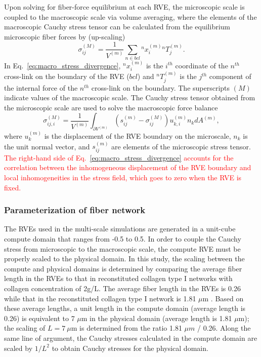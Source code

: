 \documentclass[10pt]{asme2ej}
\begin{document}
Upon solving for fiber-force equilibrium at each RVE, the microscopic scale is coupled to the macroscopic scale via volume averaging, where the elements of the macroscopic Cauchy stress tensor can be calculated from the equilibrium microscopic fiber forces by (up-scaling)\cite{Chandran:2007hy,Stylianopoulos:2007dp}
%
\begin{equation}
\sigma_{ij}^{(M)} = \frac{1}{V^{(m)}} \sum_{n \in bcl} {}^n x_i^{(m)} {}^n T_j^{(m)}.
\label{eq:macro_stress_discrete}
\end{equation}
%
In Eq.\ \eqref{eq:macro_stress_divergence}, ${}^nx_i^{(m)}$ is the $i^{th}$ coordinate of the $n^{th}$ cross-link on the boundary of the RVE ($bcl$) and ${}^nT_j^{(m)}$ is the $j^{th}$ component of the internal force of the $n^{th}$ cross-link on the boundary. The superscripts $(M)$ indicate values of the macroscopic scale. The Cauchy stress tensor obtained from the microscopic scale are used to solve the macroscopic force balance \cite{Chandran:2007hy,Stylianopoulos:2007dp}
%
\begin{equation}
\sigma_{ij,i}^{(M)} = \frac{1}{V^{(m)}} \int_{\partial V^{(m)}} \left( s_{ij}^{(m)} - \sigma_{ij}^{(M)} \right)u_{k,i}^{(m)} n_k dA^{(m)},
\label{eq:macro_stress_divergence}
\end{equation}
%
where $u_k^{(m)}$ is the displacement of the RVE boundary on the microscale, $n_k$ is the unit normal vector, and $s_{ij}^{(m)}$ are elements of the microscopic stress tensor. \textcolor{red}{The right-hand side of Eq.\ \eqref{eq:macro_stress_divergence} accounts for the correlation between the inhomogeneous displacement of the RVE boundary and local inhomogeneities in the stress field, which goes to zero when the RVE is fixed.}

\subsubsection{Parameterization of fiber network}
The RVEs used in the multi-scale simulations are generated in a unit-cube compute domain that ranges from -0.5 to 0.5. In order to couple the Cauchy stress from microscopic to the macroscopic scale, the compute RVE must be properly scaled to the physical domain. In this study, the scaling between the compute and physical domains is determined by comparing the average fiber length in the RVEs to that in reconstituted collagen type I networks \cite{Lindstrom:2013gd} with collagen concentration of 2g/L. The average fiber length in the RVEs is 0.26 while that in the reconstituted collagen type I network is 1.81 $\mu$m \cite{Lindstrom:2013gd}. Based on these average lengths, a unit length in the compute  domain (average length is 0.26) is equivalent to 7 $\mu$m in the physical domain (average length is 1.81 $\mu$m); the scaling of $L=7 \ \mu$m is determined from the ratio 1.81 $\mu m$ / 0.26. Along the same line of argument, the Cauchy stresses calculated in the compute domain are scaled by $1/L^2$ to obtain Cauchy stresses for the physical domain.
\end{document}
